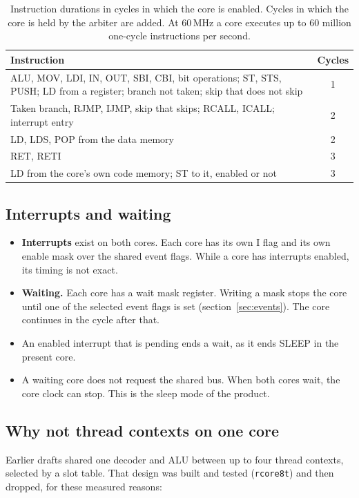 \documentclass[10pt,a4paper]{article}
\begin{document}
\begin{table}[!htb]
\centering\small
\begin{tabularx}{\linewidth}{@{}Lc@{}}
\toprule
Instruction & Cycles \\
\midrule
ALU, MOV, LDI, IN, OUT, SBI, CBI, bit operations; ST, STS, PUSH; LD from a register; branch not taken; skip that does not skip & 1 \\
Taken branch, RJMP, IJMP, skip that skips; RCALL, ICALL; interrupt entry & 2 \\
LD, LDS, POP from the data memory & 2 \\
RET, RETI & 3 \\
LD from the core's own code memory; ST to it, enabled or not & 3 \\
\bottomrule
\end{tabularx}
\caption{Instruction durations in cycles in which the core is enabled. Cycles in which the core is held by the
arbiter are added. At 60\,MHz a core executes up to 60 million one-cycle instructions per second.}
\label{tab:dur}
\end{table}

\subsection{Interrupts and waiting}

\begin{itemize}
\item \textbf{Interrupts} exist on both cores. Each core has its own I flag and its own enable mask over the
shared event flags. While a core has interrupts enabled, its timing is not exact.
\item \textbf{Waiting.} Each core has a wait mask register. Writing a mask stops the core until one of the
selected event flags is set (section~\ref{sec:events}). The core continues in the cycle after that.
\item An enabled interrupt that is pending ends a wait, as it ends SLEEP in the present core.
\item A waiting core does not request the shared bus. When both cores wait, the core clock can stop. This is the
sleep mode of the product.
\end{itemize}

\subsection{Why not thread contexts on one core}

Earlier drafts shared one decoder and ALU between up to four thread contexts, selected by a slot table. That
design was built and tested (\texttt{rcore8t}) and then dropped, for these measured reasons:
\end{document}
